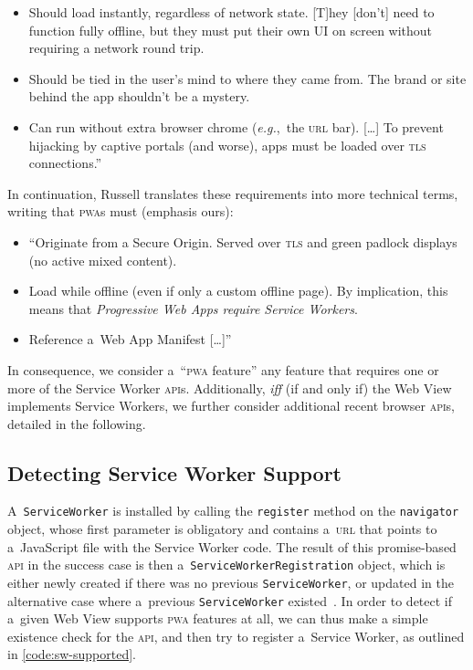 \documentclass[sigconf]{acmart}
\begin{document}
\begin{itemize}
  \item Should load instantly, regardless of network state.
    [T]hey [don't] need to function fully offline,
    but they must put their own UI on screen without requiring a network round trip.
  \item Should be tied in the user's mind to where they came from.
    The brand or site behind the app shouldn't be a mystery.
  \item Can run without extra browser chrome (\emph{e.g.},\ the \textsc{url} bar).
    [\ldots] To prevent hijacking by captive portals (and worse),
    apps must be loaded over \textsc{tls} connections.''
\end{itemize}

In continuation, Russell translates these requirements into more technical terms,
writing that \textsc{pwa}s must (emphasis ours):

\begin{itemize}
  \item ``Originate from a Secure Origin.
    Served over \textsc{tls} and green padlock displays (no active mixed content).
  \item Load while offline (even if only a custom offline page).
    By implication, this means that \emph{Progressive Web Apps require Service Workers}.
  \item Reference a~Web App Manifest [\ldots]''
\end{itemize}

In consequence, we consider a~``\textsc{pwa} feature''
any feature that requires  one or more of the Service Worker \textsc{api}s.
Additionally, \emph{iff} (if and only if) the Web View implements Service Workers,
we further consider additional recent browser \textsc{api}s,
detailed in the following.

\subsection{Detecting Service Worker Support}

A~\texttt{ServiceWorker} is installed by calling the \texttt{register} method
on the \texttt{navigator} object, whose first parameter is obligatory
and contains a~\textsc{url} that points to a~JavaScript file with the Service Worker code.
The result of this promise-based \textsc{api} in the success case is then
a~\texttt{ServiceWorkerRegistration} object,
which is either newly created if there was no previous \texttt{ServiceWorker},
or updated in the alternative case
where a~previous \texttt{ServiceWorker} existed~\cite{russell2017serviceworkers}.
In order to detect if a~given Web View supports \textsc{pwa} features at all,
we can thus make a simple existence check for the \textsc{api},
and then try to register a~Service Worker, as outlined in \autoref{code:sw-supported}.
\end{document}
